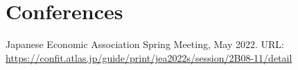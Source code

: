 \newcommand{\playsymbol}{$\blacktriangleright$}

\section{\sc Conferences}
\begin{etaremune}
\item
  Japanese Economic Association Spring Meeting, May 2022. URL: \href{https://confit.atlas.jp/guide/print/jea2022s/session/2B08-11/detail}{https://confit.atlas.jp/guide/print/jea2022s/session/2B08-11/detail}
\end{etaremune}


